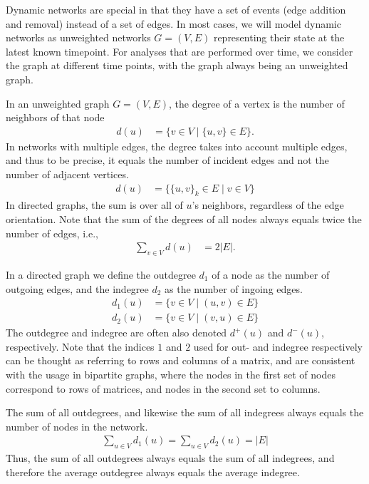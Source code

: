 \documentclass{article}
\begin{document}
Dynamic networks are special in that they have a set of events (edge
addition and removal) instead of a set of edges.  In most cases, we will
model dynamic networks as unweighted networks $G=(V,E)$ representing
their state at the latest known timepoint.  For analyses that are
performed over time, we consider the graph at different time points,
with the graph always being an unweighted graph. 

In an unweighted graph $G=(V,E)$, the degree of a vertex is the number
of neighbors of that node
\begin{align}
  d(u) &= \{ v \in V \mid \{u,v\} \in E \}. 
\end{align}
In networks with multiple edges, the degree takes into account multiple
edges, and thus to be precise, it equals the number of incident edges
and not the number of adjacent vertices. 
\begin{align}
  d(u) &= \{ \{u,v\}_k \in E \mid v \in V \}
\end{align}
In directed graphs, the sum is over all of $u$'s neighbors, regardless
of the edge orientation. 
Note that the sum of the degrees of all nodes always equals twice the
number of edges, i.e.,
\begin{align}
  \sum_{v\in V} d(u) &= 2|E|. 
\end{align}

In a directed graph we define the outdegree $d_1$ of a node as the number of
outgoing edges, and the indegree $d_2$ as the number of ingoing edges.
\begin{align}
  d_1(u) &= \{ v \in V \mid (u,v) \in E \} \\
  d_2(u) &= \{ v \in V \mid (v,u) \in E \}
\end{align}
The outdegree and indegree are often also denoted $d^+(u)$ and
$d^-(u)$, respectively.  Note that the indices $1$ and $2$ used for out-
and indegree respectively can be thought as referring to rows and
columns of a matrix, and are consistent with the usage in bipartite
graphs, where the nodes in the first set of nodes correspond to rows of
matrices, and nodes in the second set to columns. 

The sum of all outdegrees, and likewise the sum of all indegrees always
equals the number of nodes in the network.  
\begin{align}
  \sum_{u\in V} d_1(u) = \sum_{u \in V} d_2(u) = |E|
\end{align}
Thus, the sum of all outdegrees always equals the sum of all indegrees,
and therefore the average outdegree always equals the average indegree.  
\end{document}
